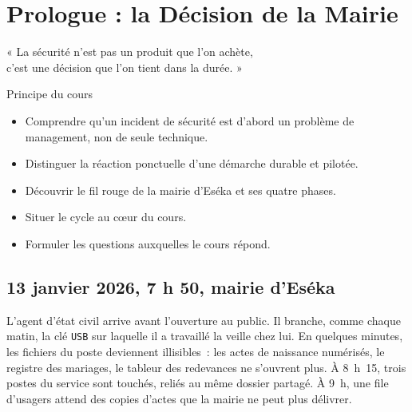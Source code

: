 
\chapter{Prologue : la Décision de la Mairie}
\label{chap:prologue}

\epigraph{%
    « La sécurité n'est pas un produit que l'on achète,\\
    c'est une décision que l'on tient dans la durée. »%
}{Principe du cours}


\begin{boxobjectifs}
\begin{itemize}
    \item Comprendre qu'un incident de sécurité est d'abord un problème de
          management, non de seule technique.
    \item Distinguer la réaction ponctuelle d'une démarche durable et pilotée.
    \item Découvrir le fil rouge de la mairie d'Eséka et ses quatre phases.
    \item Situer le cycle  au cœur du cours.
    \item Formuler les questions auxquelles le cours répond.
\end{itemize}
\end{boxobjectifs}

\bigskip

\section*{13 janvier 2026, 7 h 50, mairie d'Eséka}

L'agent d'état civil arrive avant l'ouverture au public. Il branche, comme
chaque matin, la clé \texttt{USB} sur laquelle il a travaillé la veille chez
lui. En quelques minutes, les fichiers du poste deviennent illisibles~: les
actes de naissance numérisés, le registre des mariages, le tableur des
redevances ne s'ouvrent plus. À 8~h~15, trois postes du service sont touchés,
reliés au même dossier partagé. À 9~h, une file d'usagers attend des copies
d'actes que la mairie ne peut plus délivrer.

